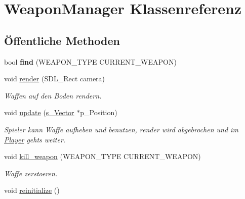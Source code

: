 \hypertarget{class_weapon_manager}{\section{Weapon\-Manager Klassenreferenz}
\label{class_weapon_manager}
}
\subsection*{Öffentliche Methoden}
\begin{DoxyCompactItemize}
\item 
\hypertarget{class_weapon_manager_ae2371fd70863bc0e51362b9798190c30}{bool {\bfseries find} (W\-E\-A\-P\-O\-N\-\_\-\-T\-Y\-P\-E C\-U\-R\-R\-E\-N\-T\-\_\-\-W\-E\-A\-P\-O\-N)}\label{class_weapon_manager_ae2371fd70863bc0e51362b9798190c30}

\item 
\hypertarget{class_weapon_manager_acb9216f61525ede5ed970b5d558db9e9}{void \hyperlink{class_weapon_manager_acb9216f61525ede5ed970b5d558db9e9}{render} (S\-D\-L\-\_\-\-Rect camera)}\label{class_weapon_manager_acb9216f61525ede5ed970b5d558db9e9}

\begin{DoxyCompactList}\small\item\em Waffen auf den Boden rendern. \end{DoxyCompactList}\item 
\hypertarget{class_weapon_manager_a59cc9e0d6cb21105cf00ac419ea2a573}{void \hyperlink{class_weapon_manager_a59cc9e0d6cb21105cf00ac419ea2a573}{update} (\hyperlink{structs___vector}{s\-\_\-\-Vector} $\ast$p\-\_\-\-Position)}\label{class_weapon_manager_a59cc9e0d6cb21105cf00ac419ea2a573}

\begin{DoxyCompactList}\small\item\em Spieler kann Waffe aufheben und benutzen, render wird abgebrochen und im \hyperlink{class_player}{Player} gehts weiter. \end{DoxyCompactList}\item 
\hypertarget{class_weapon_manager_a82c763fa5b480335c46a6675cd25f9e5}{void \hyperlink{class_weapon_manager_a82c763fa5b480335c46a6675cd25f9e5}{kill\-\_\-weapon} (W\-E\-A\-P\-O\-N\-\_\-\-T\-Y\-P\-E C\-U\-R\-R\-E\-N\-T\-\_\-\-W\-E\-A\-P\-O\-N)}\label{class_weapon_manager_a82c763fa5b480335c46a6675cd25f9e5}

\begin{DoxyCompactList}\small\item\em Waffe zerstoeren. \end{DoxyCompactList}\item 
\hypertarget{class_weapon_manager_a8d7e4a4638847ef3c39323a37dddd616}{void \hyperlink{class_weapon_manager_a8d7e4a4638847ef3c39323a37dddd616}{reinitialize} ()}\label{class_weapon_manager_a8d7e4a4638847ef3c39323a37dddd616}


\end{DoxyCompactItemize}

